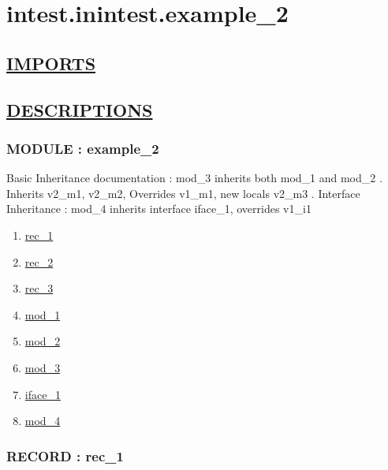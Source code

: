 \chapter*{intest.inintest.example\_2}

\section*{\underline{IMPORTS}}

\section*{\underline{DESCRIPTIONS}}
\subsection*{MODULE : example\_2}
\hypertarget{ecldoc:intest.inintest.example_2_intest.inintest.example_2}{}
Basic Inheritance documentation : mod\_3 inherits both mod\_1 and mod\_2 . Inherits v2\_m1, v2\_m2, Overrides v1\_m1, new locals v2\_m3 . Interface Inheritance : mod\_4 inherits interface iface\_1, overrides v1\_i1 \\
\begin{enumerate}
\item \hyperlink{ecldoc:intest.inintest.example_2_intest.inintest.example_2.rec_1}{rec\_1}
\item \hyperlink{ecldoc:intest.inintest.example_2_intest.inintest.example_2.rec_2}{rec\_2}
\item \hyperlink{ecldoc:intest.inintest.example_2_intest.inintest.example_2.rec_3}{rec\_3}
\item \hyperlink{ecldoc:intest.inintest.example_2_intest.inintest.example_2.mod_1}{mod\_1}
\item \hyperlink{ecldoc:intest.inintest.example_2_intest.inintest.example_2.mod_2}{mod\_2}
\item \hyperlink{ecldoc:intest.inintest.example_2_intest.inintest.example_2.mod_3}{mod\_3}
\item \hyperlink{ecldoc:intest.inintest.example_2_intest.inintest.example_2.iface_1}{iface\_1}
\item \hyperlink{ecldoc:intest.inintest.example_2_intest.inintest.example_2.mod_4}{mod\_4}
\end{enumerate}
\subsection*{RECORD : rec\_1}
\hypertarget{ecldoc:intest.inintest.example_2_intest.inintest.example_2.rec_1}{}
